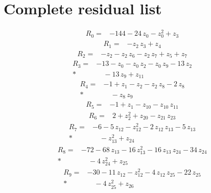 \documentclass[10pt]{article}
\begin{document}
\section*{Complete residual list}
\begin{align*}
R_{0}={}& - 144 - 24\,z_{0} - z_{0}^{2} + z_{3}
\end{align*}
\begin{align*}
R_{1}={}& - z_{2}\,z_{3} + z_{4}
\end{align*}
\begin{align*}
R_{2}={}& - z_{2} - z_{2}\,z_{6} - z_{2}\,z_{7} + z_{5} + z_{7}
\end{align*}
\begin{align*}
R_{3}={}& - 13 - z_{0} - z_{0}\,z_{2} - z_{0}\,z_{9} - 13\,z_{2} \\*
&\quad - 13\,z_{9} + z_{11}
\end{align*}
\begin{align*}
R_{4}={}& - 1 + z_{1} - z_{2} - z_{2}\,z_{8} - 2\,z_{8} \\*
&\quad - z_{8}\,z_{9}
\end{align*}
\begin{align*}
R_{5}={}& - 1 + z_{1} - z_{10} - z_{10}\,z_{11}
\end{align*}
\begin{align*}
R_{6}={}& 2 + z_{2}^{2} + z_{20} - z_{21}\,z_{23}
\end{align*}
\begin{align*}
R_{7}={}& - 6 - 5\,z_{12} - z_{12}^{2} - 2\,z_{12}\,z_{13} - 5\,z_{13} \\*
&\quad - z_{13}^{2} + z_{24}
\end{align*}
\begin{align*}
R_{8}={}& - 72 - 68\,z_{13} - 16\,z_{13}^{2} - 16\,z_{13}\,z_{24} - 34\,z_{24} \\*
&\quad - 4\,z_{24}^{2} + z_{25}
\end{align*}
\begin{align*}
R_{9}={}& - 30 - 11\,z_{12} - z_{12}^{2} - 4\,z_{12}\,z_{25} - 22\,z_{25} \\*
&\quad - 4\,z_{25}^{2} + z_{26}
\end{align*}
\end{document}
